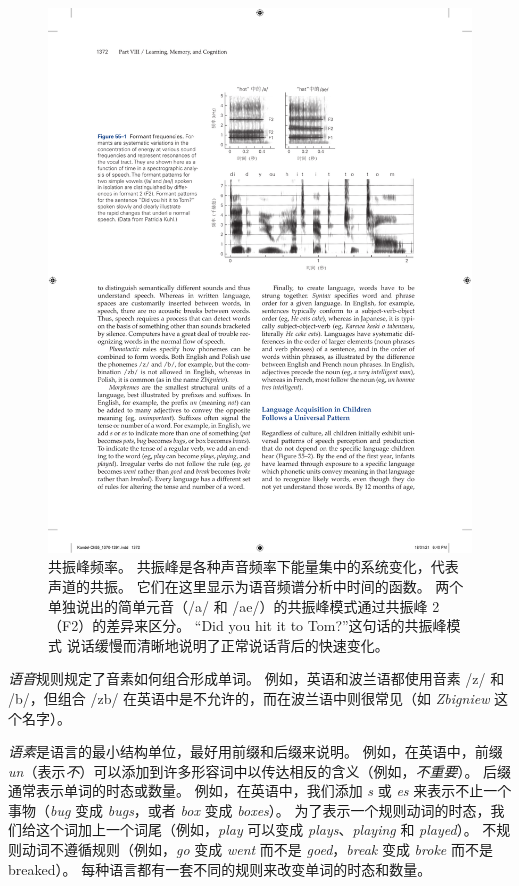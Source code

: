 \begin{figure}[htbp]
	\centering
	\includegraphics[width=0.81\linewidth]{chap55/fig_55_1}
	\caption{共振峰频率。
	共振峰是各种声音频率下能量集中的系统变化，代表声道的共振。
	它们在这里显示为语音频谱分析中时间的函数。
	两个单独说出的简单元音（/a/ 和 /ae/）的共振峰模式通过共振峰 2（F2）的差异来区分。
	“Did you hit it to Tom?”这句话的共振峰模式 说话缓慢而清晰地说明了正常说话背后的快速变化。}
	\label{fig:55_1}
\end{figure}


\textit{语音}规则规定了音素如何组合形成单词。
例如，英语和波兰语都使用音素 /z/ 和 /b/，但组合 /zb/ 在英语中是不允许的，而在波兰语中则很常见（如 \textit{Zbigniew} 这个名字）。


\textit{语素}是语言的最小结构单位，最好用前缀和后缀来说明。
例如，在英语中，前缀 \textit{un}（表示\textit{不}）可以添加到许多形容词中以传达相反的含义（例如，\textit{不重要}）。
后缀通常表示单词的时态或数量。
例如，在英语中，我们添加 \textit{s} 或 \textit{es} 来表示不止一个事物（\textit{bug} 变成 \textit{bugs}，或者 \textit{box} 变成 \textit{boxes}）。
为了表示一个规则动词的时态，我们给这个词加上一个词尾（例如，\textit{play} 可以变成 \textit{plays}、\textit{playing} 和 \textit{played}）。
不规则动词不遵循规则（例如，\textit{go} 变成 \textit{went} 而不是 \textit{goed}，\textit{break} 变成 \textit{broke} 而不是 breaked）。
每种语言都有一套不同的规则来改变单词的时态和数量。


